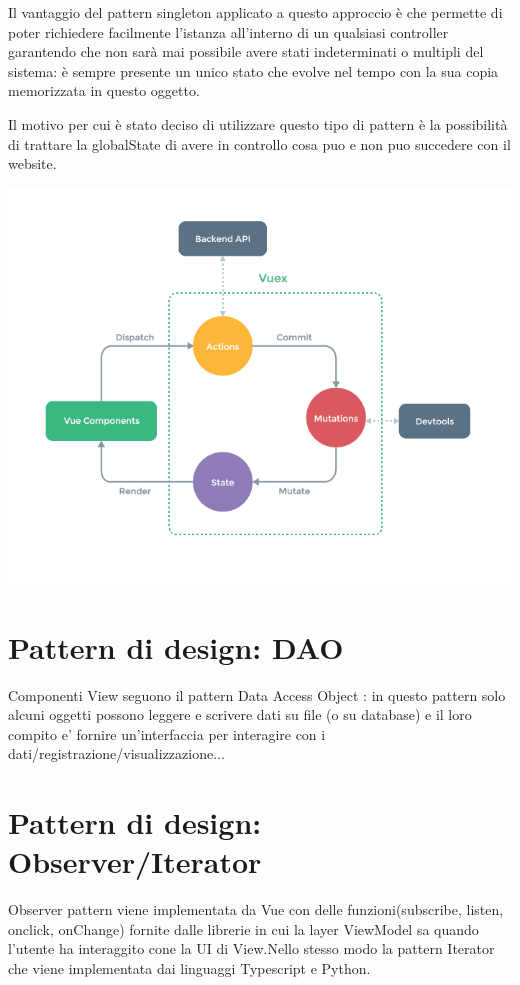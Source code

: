 \documentclass[ 4paper,11pt,openany]{book}
\begin{document}
Il vantaggio del pattern singleton applicato a questo approccio è che permette di poter richiedere facilmente l'istanza all'interno di un qualsiasi controller garantendo che non sarà mai possibile avere stati indeterminati o multipli del sistema: è sempre presente un unico stato che evolve nel tempo con la sua copia memorizzata in questo oggetto.

Il motivo per cui è stato deciso di utilizzare questo tipo di pattern è la possibilità di trattare la globalState di avere in controllo cosa puo e non puo succedere con il website.
\begin{center}
	\includegraphics[width=170mm]{Vuevuex.png}
\end{center}

\section{Pattern di design: DAO}
Componenti View seguono il pattern Data Access Object : in questo pattern solo alcuni oggetti possono leggere e scrivere dati su file (o su database) e il loro compito e' fornire un'interfaccia per interagire con i dati/registrazione/visualizzazione...


\section{Pattern di design: Observer/Iterator}
Observer pattern viene implementata da Vue con delle funzioni(subscribe, listen, onclick, onChange) fornite dalle librerie in cui la layer ViewModel sa quando l'utente ha interaggito cone la UI di View.Nello stesso modo la pattern Iterator che viene implementata dai linguaggi Typescript e Python.
\end{document}

